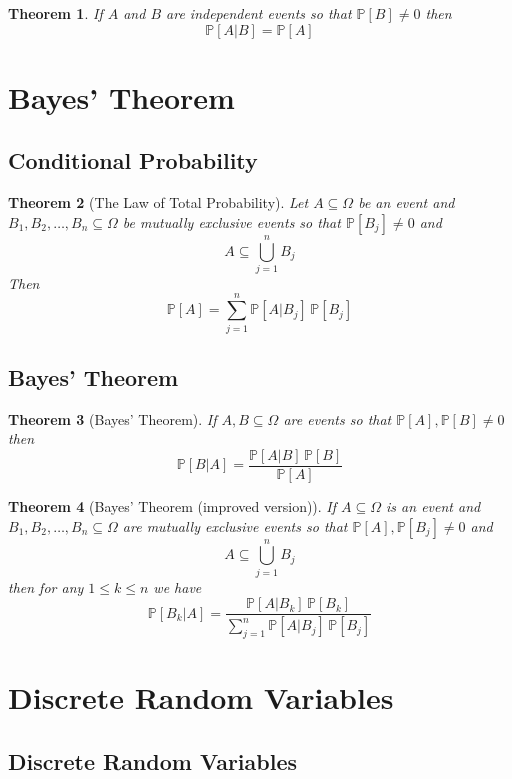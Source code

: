 \documentclass{article}
\newcommand{\PP}{\mathbb{P}}
\theoremstyle{plain}
\newtheorem{thm}{Theorem}[section]
\theoremstyle{definition}
\theoremstyle{remark}
\begin{document}
\begin{thm}
    If $A$ and $B$ are independent events so that $\PP[B] \neq 0$ then \[\PP[A \vert B] = \PP[A]\]
\end{thm}


\section{Bayes' Theorem}
\subsection{Conditional Probability}

\begin{thm}[The Law of Total Probability]
    Let $A \subseteq \Omega$ be an event and $B_1, B_2, \dotsc, B_n \subseteq \Omega$ be mutually exclusive events so that $\PP[B_j] \neq 0$ and \[A \subseteq \bigcup_{j=1}^nB_j\] Then \[\PP[A] = \sum_{j=1}^n\PP[A \vert B_j]\,\PP[B_j]\]
\end{thm}

\subsection{Bayes' Theorem}

\begin{thm}[Bayes' Theorem]
    If $A, B \subseteq \Omega$ are events so that $\PP[A], \PP[B] \neq 0$ then \[\PP[B \vert A] = \frac{\PP[A \vert B]\,\PP[B]}{\PP[A]}\]
\end{thm}

\begin{thm}[Bayes' Theorem (improved version)]
    If $A \subseteq \Omega$ is an event and $B_1, B_2, \dotsc, B_n \subseteq \Omega$ are mutually exclusive events so that $\PP[A], \PP[B_j] \neq 0$ and \[A \subseteq \bigcup_{j=1}^nB_j\] then for any $1 \leq k \leq n$ we have \[\PP[B_k \vert A] = \frac{\PP[A \vert B_k]\,\PP[B_k]}{\sum_{j=1}^n\PP[A \vert B_j]\,\PP[B_j]}\]
\end{thm}

\section{Discrete Random Variables}

\subsection{Discrete Random Variables}
\end{document}
